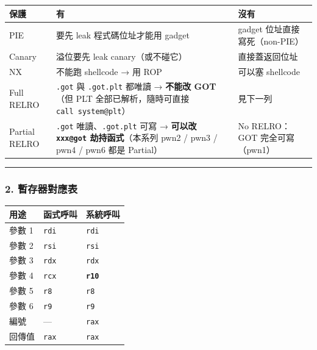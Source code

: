 \documentclass[10pt,a4paper]{article}
\newcounter{none}
\begin{document}
{\def\LTcaptype{none} %
\begin{longtable}[]{@{}
  >{\raggedright\arraybackslash}p{}
  >{\raggedright\arraybackslash}p{}
  >{\raggedright\arraybackslash}p{}@{}}
\toprule\noalign{}
\begin{minipage}[b]{\linewidth}\raggedright
保護
\end{minipage} & \begin{minipage}[b]{\linewidth}\raggedright
有
\end{minipage} & \begin{minipage}[b]{\linewidth}\raggedright
沒有
\end{minipage} \\
\midrule\noalign{}
\endhead
\bottomrule\noalign{}
\endlastfoot
PIE & 要先 leak 程式碼位址才能用 gadget & gadget
位址直接寫死（non-PIE） \\
Canary & 溢位要先 leak canary（或不碰它） & 直接蓋返回位址 \\
NX & 不能跑 shellcode → 用 ROP & 可以塞 shellcode \\
Full RELRO & \texttt{.\allowbreak{}got} 與 \texttt{.\allowbreak{}got.\allowbreak{}plt} 都唯讀 → \textbf{不能改
GOT}（但 PLT 全部已解析，隨時可直接 \texttt{call\ \allowbreak{}system@plt}） &
見下一列 \\
Partial RELRO & \texttt{.\allowbreak{}got} 唯讀、\texttt{.\allowbreak{}got.\allowbreak{}plt} 可寫 →
\textbf{可以改 \texttt{xxx@got} 劫持函式}（本系列 pwn2 / pwn3 / pwn4 /
pwn6 都是 Partial） & No RELRO：GOT 完全可寫（pwn1） \\
\end{longtable}
}

\begin{center}\rule{0.5\linewidth}{0.5pt}\end{center}

\subsubsection{2.
暫存器對應表}\label{ux66abux5b58ux5668ux5c0dux61c9ux8868}

{\def\LTcaptype{none} %
\begin{longtable}[]{@{}lll@{}}
\toprule\noalign{}
用途 & 函式呼叫 & 系統呼叫 \\
\midrule\noalign{}
\endhead
\bottomrule\noalign{}
\endlastfoot
參數 1 & \texttt{rdi} & \texttt{rdi} \\
參數 2 & \texttt{rsi} & \texttt{rsi} \\
參數 3 & \texttt{rdx} & \texttt{rdx} \\
參數 4 & \texttt{rcx} & \textbf{\texttt{r10}} \\
參數 5 & \texttt{r8} & \texttt{r8} \\
參數 6 & \texttt{r9} & \texttt{r9} \\
編號 & --- & \texttt{rax} \\
回傳值 & \texttt{rax} & \texttt{rax} \\
\end{longtable}
}
\end{document}
